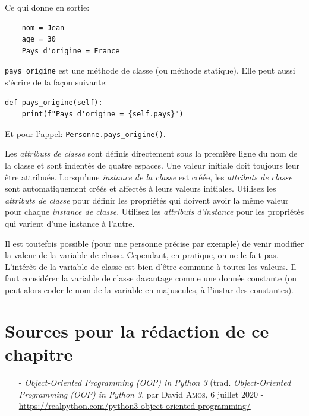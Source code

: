\documentclass[a4paper,12pt]{book}
\begin{document}
Ce qui donne en sortie:
\begin{verbatim}
    nom = Jean
    age = 30
    Pays d'origine = France
\end{verbatim}
\medskip

\texttt{pays\_origine} est une méthode de classe (ou méthode statique). Elle peut aussi s'écrire de la façon suivante:
\begin{lstlisting}
def pays_origine(self):
    print(f"Pays d'origine = {self.pays}")
\end{lstlisting}
\medskip

Et pour l'appel: \texttt{Personne.pays\_origine()}.
\medskip

Les \textit{attributs de classe} sont définis directement sous la première ligne du nom de la classe et sont indentés de quatre espaces. Une valeur initiale doit toujours leur être attribuée. Lorsqu'une \textit{instance de la classe} est créée, les \textit{attributs de classe} sont automatiquement créés et affectés à leurs valeurs initiales. Utilisez les \textit{attributs de classe} pour définir les propriétés qui doivent avoir la même valeur pour chaque \textit{instance de classe}. Utilisez les \textit{attributs d'instance} pour les propriétés qui varient d'une instance à l'autre.
\medskip

Il est toutefois possible (pour une personne précise par exemple) de venir modifier la valeur de la variable de classe. Cependant, en pratique, on ne le fait pas. L'intérêt de la variable de classe est bien d'être commune à toutes les valeurs. Il faut considérer la variable de classe davantage comme une donnée constante (on peut alors coder le nom de la variable en majuscules, à l'instar des constantes).
\medskip

\section*{Sources pour la rédaction de ce chapitre}
\begin{itemize}
	\item[-] \textit{Object-Oriented Programming (OOP) in Python 3} (trad. \textit{Object-Oriented Programming (OOP) in Python 3}, par David \textsc{Amos}, 6 juillet 2020 - \\ \url{https://realpython.com/python3-object-oriented-programming/}
\end{itemize}
\medskip
\end{document}
